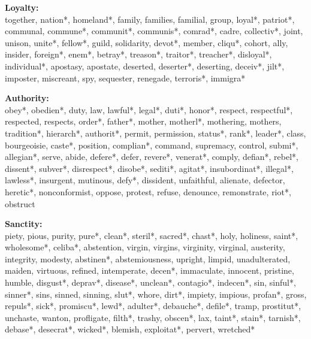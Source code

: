 \documentclass[12pt]{article}
\begin{document}
\begin{flushleft}
\textbf{Loyalty:}\\
together, nation*, homeland*, family, families, familial, group, loyal*, patriot*, communal, commune*, communit*, communis*, comrad*, cadre, collectiv*, joint, unison, unite*, fellow*, guild, solidarity, devot*, member, cliqu*, cohort, ally, insider, foreign*, enem*, betray*, treason*, traitor*, treacher*, disloyal*, individual*, apostasy, apostate, deserted, deserter*, deserting, deceiv*, jilt*, imposter, miscreant, spy, sequester, renegade, terroris*, immigra*
\vspace{.5cm}

\textbf{Authority:}\\
obey*, obedien*, duty, law, lawful*, legal*, duti*, honor*, respect, respectful*, respected, respects, order*, father*, mother, motherl*, mothering, mothers, tradition*, hierarch*, authorit*, permit, permission, status*, rank*, leader*, class, bourgeoisie, caste*, position, complian*, command, supremacy, control, submi*, allegian*, serve, abide, defere*, defer, revere*, venerat*, comply, defian*, rebel*, dissent*, subver*, disrespect*, disobe*, sediti*, agitat*, insubordinat*, illegal*, lawless*, insurgent, mutinous, defy*, dissident, unfaithful, alienate, defector, heretic*, nonconformist, oppose, protest, refuse, denounce, remonstrate, riot*, obstruct
\vspace{.5cm}

\textbf{Sanctity:}\\
piety, pious, purity, pure*, clean*, steril*, sacred*, chast*, holy, holiness, saint*, wholesome*, celiba*, abstention, virgin, virgins, virginity, virginal, austerity, integrity, modesty, abstinen*, abstemiousness, upright, limpid, unadulterated, maiden, virtuous, refined, intemperate, decen*, immaculate, innocent, pristine, humble, disgust*, deprav*, disease*, unclean*, contagio*, indecen*, sin, sinful*, sinner*, sins, sinned, sinning, slut*, whore, dirt*, impiety, impious, profan*, gross, repuls*, sick*, promiscu*, lewd*, adulter*, debauche*, defile*, tramp, prostitut*, unchaste, wanton, profligate, filth*, trashy, obscen*, lax, taint*, stain*, tarnish*, debase*, desecrat*, wicked*, blemish, exploitat*, pervert, wretched*
\vspace{.5cm}


\end{flushleft}
\end{document}
